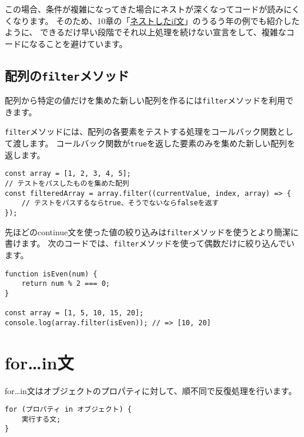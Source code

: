 この場合、条件が複雑になってきた場合にネストが深くなってコードが読みにくくなります。
そのため、10章の「\hyperlink{nested-if-statement}{ネストしたif文}」のうるう年の例でも紹介したように、
できるだけ早い段階でそれ以上処理を続けない宣言をして、複雑なコードになることを避けています。

\hypertarget{array-filter}{%
\subsection{\texorpdfstring{配列の\texttt{filter}メソッド}{配列のfilterメソッド}}\label{array-filter}}

配列から特定の値だけを集めた新しい配列を作るには\texttt{filter}メソッドを利用できます。

\texttt{filter}メソッドには、配列の各要素をテストする処理をコールバック関数として渡します。
コールバック関数が\texttt{true}を返した要素のみを集めた新しい配列を返します。\enlargethispage{\baselineskip}

\begin{lstlisting}
const array = [1, 2, 3, 4, 5];
// テストをパスしたものを集めた配列
const filteredArray = array.filter((currentValue, index, array) => {
    // テストをパスするならtrue、そうでないならfalseを返す
});
\end{lstlisting}

先ほどのcontinue文を使った値の絞り込みは\texttt{filter}メソッドを使うとより簡潔に書けます。
次のコードでは、\texttt{filter}メソッドを使って偶数だけに絞り込んでいます。

\begin{lstlisting}
function isEven(num) {
    return num % 2 === 0;
}

const array = [1, 5, 10, 15, 20];
console.log(array.filter(isEven)); // => [10, 20]
\end{lstlisting}

\hypertarget{for-in-statement}{%
\section{for\ldots{}in文}\label{for-in-statement}}

for\ldots{}in文はオブジェクトのプロパティに対して、順不同で反復処理を行います。

\begin{lstlisting}
for (プロパティ in オブジェクト) {
    実行する文;
}
\end{lstlisting}

